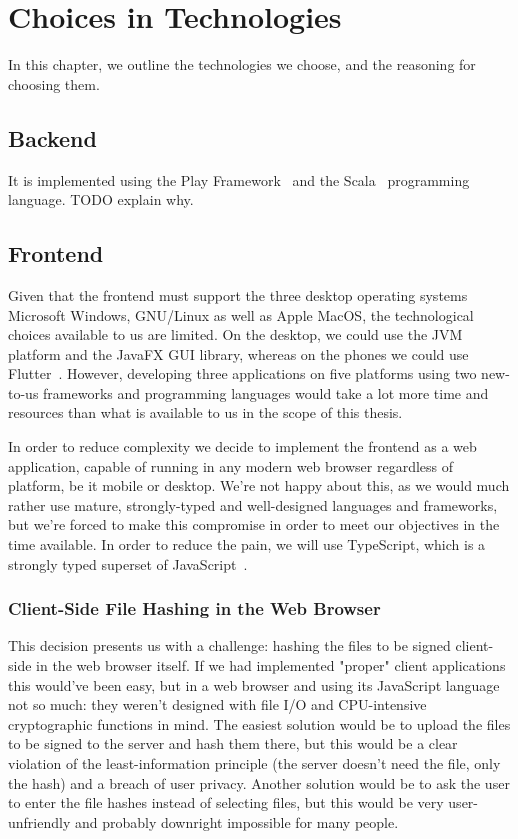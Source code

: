 \chapter*{Choices in Technologies}
\label{ch:techchoices}
In this chapter, we outline the technologies we choose, and the reasoning for choosing them.

\section{Backend}
\label{sec:techbackend}
It is implemented using the Play Framework~\cite{playframework} and the Scala~\cite{scalalang} programming language.
TODO explain why.

\section{Frontend}
\label{sec:techfrontend}

Given that the frontend must support the three desktop operating systems Microsoft Windows, GNU/Linux as well as Apple MacOS,
the technological choices available to us are limited.
On the desktop, we could use the \gls{JVM} platform and the JavaFX \gls{GUI} library, whereas on the phones
we could use Flutter~\cite{flutterframework}.
However, developing three applications on five platforms using two new-to-us frameworks and programming languages
would take a lot more time and resources than what is available to us in the scope of this thesis.

In order to reduce complexity we decide to implement the frontend as a web application, capable of running
in any modern web browser regardless of platform, be it mobile or desktop.
We're not happy about this, as we would much rather use mature, strongly-typed and well-designed languages and frameworks,
but we're forced to make this compromise in order to meet our objectives in the time available.
In order to reduce the pain, we will use TypeScript, which is a strongly typed superset of JavaScript~\cite{loltypes}.

\subsection{Client-Side File Hashing in the Web Browser}
\label{subsec:browserhashing}
This decision presents us with a challenge: hashing the files to be signed client-side in the web browser itself.
If we had implemented "proper" client applications this would've been easy, but in a web browser and using its
JavaScript language not so much: they weren't designed with file I/O and CPU-intensive cryptographic functions in mind.
The easiest solution would be to upload the files to be signed to the server and hash them there,
but this would be a clear violation of the least-information principle (the server doesn't need the file, only the hash)
and a breach of user privacy.
Another solution would be to ask the user to enter the file hashes instead of selecting files,
but this would be very user-unfriendly and probably downright impossible for many people.

